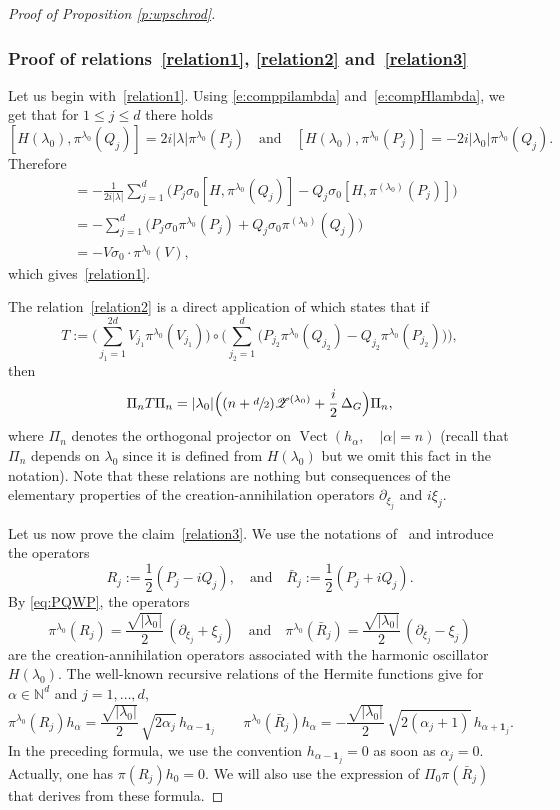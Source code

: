 \documentclass[JEP,XML,SOM,Unicode,published]{cedram}
\let\mathcal\mathscr
\newcommand{\bun}{\mathbf{1}}
\DeclareMathOperator{\Vect}{Vect}
\theoremstyle{plain}
\theoremstyle{definition}
\def\N{{\mathbb N}}
\begin{document}
\begin{proof}[Proof of Proposition \ref{p:wpschrod}]
\subsubsection*{Proof of relations~\eqref{relation1}, \eqref{relation2} and~\eqref{relation3}}
Let us begin with~\eqref{relation1}. Using \eqref{e:comppilambda} and~\eqref{e:compHlambda}, we get that for $1\leq j\leq d$ there holds
\[
[H(\lambda_0), \pi^{\lambda_0}(Q_j) ]= 2i|\lambda|\pi^{\lambda_0}(P_j)\quad \mbox{and}\quad
[H(\lambda_0), \pi^{\lambda_0}(P_j) ]= -2i|\lambda_0|\pi^{\lambda_0}(Q_j).
\]
Therefore
\begin{align*}
[H(\lambda_0), \theta_0] &= - \frac 1{2i|\lambda|} \sum_{j=1}^d \bigl(P_j \sigma_0 [H, \pi^{\lambda_0}(Q_j)]-Q_j\sigma_0 [H, \pi^{(\lambda_0)}(P_j)]\bigr)\\
&= - \sum_{j=1}^{d} \bigl(P_j \sigma_0\pi^{\lambda_0}(P_j)+Q_j \sigma_0 \pi^{(\lambda_0)}(Q_j)\bigr)\\
&= - V\sigma_0\cdot \pi^{\lambda_0}(V),
\end{align*}
which gives~\eqref{relation1}.

The relation~\eqref{relation2} is a direct application of \cite[Lem.\,B.2]{FF} which states that if
\[
T:=
\biggl(\sum_{j_1=1}^{2d}
V_{j_1} \pi^{\lambda_0} (V_{j_1})\biggr)\circ
\biggl(\sum_{j_2=1}^d
\bigl(P_{j_2} \pi^{\lambda_0} (Q_{j_2}) - Q_{j_2} \pi^{\lambda_0}(P_{j_2})\bigr)\biggr),
\]
then
\begin{equation*}\label{eq:PinTPin}
\Pi_n T \Pi_n =
|\lambda_0|
\Bigl((n+\sfrac d2) {\mathcal Z}^{(\lambda_0)}
+\frac i 2\, \Delta_G\Bigr) \Pi_n,
\end{equation*}
where $\Pi_n$ denotes the orthogonal projector on $\Vect(h_\alpha,\quad |\alpha|=n)$ (recall that $\Pi_n$ depends on $\lambda_0$ since it is defined from $H(\lambda_0)$ but we omit this fact in the notation).
Note that these relations are nothing but consequences of the elementary properties of the creation-annihilation operators $\partial_{\xi_j}$ and $i\xi_j$.

Let us now prove the claim~\eqref{relation3}. We use the notations of~\cite{FF} and introduce the operators
\[
R_j := \frac12 (P_j - iQ_j),
\quad\mbox{and}\quad
\bar R_j := \frac12 (P_j + iQ_j).
\]
By \eqref{eq:PQWP}, the operators
\[
\pi^{\lambda_0} (R_j)=\frac{\sqrt{|\lambda_0|}}2 \,(\partial_{\xi_j} +\xi_j)\quad\text{and}\quad
\pi^{\lambda_0} (\bar R_j)=\frac{\sqrt{|\lambda_0|}}2 \,(\partial_{\xi_j} -\xi_j)
\]
are the creation-annihilation operators associated with the harmonic oscillator $H(\lambda_0)$.
The well-known recursive relations of the Hermite functions
	give for
$\alpha\in \N^d$ and $j=1,\ldots,d$,
\[
\pi^{\lambda_0} (R_j) h_\alpha
= \frac{\sqrt{|\lambda_0|}}2\,
\sqrt{2\alpha_j}\, h_{\alpha-\bun_j}
\qquad
\pi^{\lambda_0}(\bar R_j) h_\alpha
= -\frac{\sqrt{|\lambda_0|}}2\,
\sqrt{2(\alpha_j+1)}\, h_{\alpha+\bun_j}.
\]
In the preceding formula, we use the convention $h_{\alpha-\bun_j}=0$ as soon as $\alpha_j=0$. Actually, one has $\pi(R_j) h_0=0$. We will also use the expression of $\Pi_0 \pi(\bar R_j)$ that derives from these formula.


\end{proof}
\end{document}
